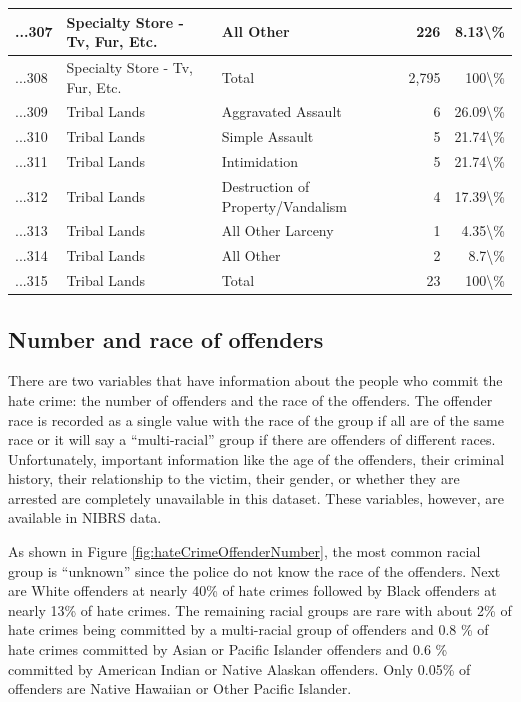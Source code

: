 \documentclass[
]{krantz}
\begin{document}
\begin{longtable}[t]{l|l|l|r|r}
\hline
...307 & Specialty Store - Tv, Fur, Etc. & All Other & 226 & 8.13\textbackslash{}\%\\
\hline
...308 & Specialty Store - Tv, Fur, Etc. & Total & 2,795 & 100\textbackslash{}\%\\
\hline
...309 & Tribal Lands & Aggravated Assault & 6 & 26.09\textbackslash{}\%\\
\hline
...310 & Tribal Lands & Simple Assault & 5 & 21.74\textbackslash{}\%\\
\hline
...311 & Tribal Lands & Intimidation & 5 & 21.74\textbackslash{}\%\\
\hline
...312 & Tribal Lands & Destruction of Property/Vandalism & 4 & 17.39\textbackslash{}\%\\
\hline
...313 & Tribal Lands & All Other Larceny & 1 & 4.35\textbackslash{}\%\\
\hline
...314 & Tribal Lands & All Other & 2 & 8.7\textbackslash{}\%\\
\hline
...315 & Tribal Lands & Total & 23 & 100\textbackslash{}\%\\
\hline
\end{longtable}

\subsection{Number and race of
offenders}\label{number-and-race-of-offenders}

There are two variables that have information about the
people who commit the hate crime: the number of offenders
and the race of the offenders. The offender race is recorded
as a single value with the race of the group if all are of
the same race or it will say a ``multi-racial'' group if
there are offenders of different races. Unfortunately,
important information like the age of the offenders, their
criminal history, their relationship to the victim, their
gender, or whether they are arrested are completely
unavailable in this dataset. These variables, however, are
available in NIBRS data.

As shown in Figure \ref{fig:hateCrimeOffenderNumber}, the
most common racial group is ``unknown'' since the police do
not know the race of the offenders. Next are White offenders
at nearly 40\% of hate crimes followed by Black offenders at
nearly 13\% of hate crimes. The remaining racial groups are
rare with about 2\% of hate crimes being committed by a
multi-racial group of offenders and 0.8 \% of hate crimes
committed by Asian or Pacific Islander offenders and 0.6 \%
committed by American Indian or Native Alaskan offenders.
Only 0.05\% of offenders are Native Hawaiian or Other
Pacific Islander.
\end{document}
